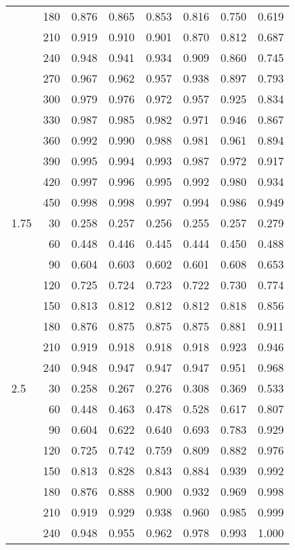 \documentclass[bimj,fleqn]{w-art}\usepackage[]{graphicx}\usepackage[]{color}
\theoremstyle{plain}
\theoremstyle{definition}
\begin{document}
\begin{table}[ht]
\begin{tabular}{lrrrrrrr}
   & 180 & 0.876 & 0.865 & 0.853 & 0.816 & 0.750 & 0.619 \\ 
   & 210 & 0.919 & 0.910 & 0.901 & 0.870 & 0.812 & 0.687 \\ 
   & 240 & 0.948 & 0.941 & 0.934 & 0.909 & 0.860 & 0.745 \\ 
   & 270 & 0.967 & 0.962 & 0.957 & 0.938 & 0.897 & 0.793 \\ 
   & 300 & 0.979 & 0.976 & 0.972 & 0.957 & 0.925 & 0.834 \\ 
   & 330 & 0.987 & 0.985 & 0.982 & 0.971 & 0.946 & 0.867 \\ 
   & 360 & 0.992 & 0.990 & 0.988 & 0.981 & 0.961 & 0.894 \\ 
   & 390 & 0.995 & 0.994 & 0.993 & 0.987 & 0.972 & 0.917 \\ 
   & 420 & 0.997 & 0.996 & 0.995 & 0.992 & 0.980 & 0.934 \\ 
   & 450 & 0.998 & 0.998 & 0.997 & 0.994 & 0.986 & 0.949 \\ 
  1.75 & 30 & 0.258 & 0.257 & 0.256 & 0.255 & 0.257 & 0.279 \\ 
   & 60 & 0.448 & 0.446 & 0.445 & 0.444 & 0.450 & 0.488 \\ 
   & 90 & 0.604 & 0.603 & 0.602 & 0.601 & 0.608 & 0.653 \\ 
   & 120 & 0.725 & 0.724 & 0.723 & 0.722 & 0.730 & 0.774 \\ 
   & 150 & 0.813 & 0.812 & 0.812 & 0.812 & 0.818 & 0.856 \\ 
   & 180 & 0.876 & 0.875 & 0.875 & 0.875 & 0.881 & 0.911 \\ 
   & 210 & 0.919 & 0.918 & 0.918 & 0.918 & 0.923 & 0.946 \\ 
   & 240 & 0.948 & 0.947 & 0.947 & 0.947 & 0.951 & 0.968 \\ 
  2.5 & 30 & 0.258 & 0.267 & 0.276 & 0.308 & 0.369 & 0.533 \\ 
   & 60 & 0.448 & 0.463 & 0.478 & 0.528 & 0.617 & 0.807 \\ 
   & 90 & 0.604 & 0.622 & 0.640 & 0.693 & 0.783 & 0.929 \\ 
   & 120 & 0.725 & 0.742 & 0.759 & 0.809 & 0.882 & 0.976 \\ 
   & 150 & 0.813 & 0.828 & 0.843 & 0.884 & 0.939 & 0.992 \\ 
   & 180 & 0.876 & 0.888 & 0.900 & 0.932 & 0.969 & 0.998 \\ 
   & 210 & 0.919 & 0.929 & 0.938 & 0.960 & 0.985 & 0.999 \\ 
   & 240 & 0.948 & 0.955 & 0.962 & 0.978 & 0.993 & 1.000 \\ 
   \hline
\end{tabular}
\end{table}
\end{document}
